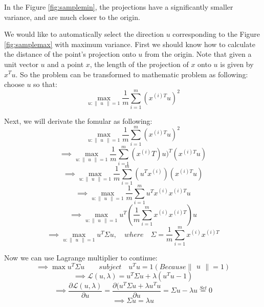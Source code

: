 \documentclass[a4paper]{article}
\begin{document}
In the Figure \ref{fig:samplemin}, the projections have a significantly smaller variance, and are much closer to the origin.

We would like to automatically select the direction $u$ corresponding to the Figure \ref{fig:samplemax} with maximum variance.  First we should know how to calculate the distance of the point's projection onto $u$ from the origin. Note that given a unit vector $u$ and a point $x$, the length of the projection of $x$ onto $u$ is given by $x^{T}u$. So the problem can be transformed to mathematic problem as following: choose $u$ so that:
$$
	\max_{u:\begin{Vmatrix}u\end{Vmatrix}=1} \frac{1}{m} \sum_{i=1}^{m}(x^{(i)T}u)^{2}
$$

Next, we will derivate the fomular as following:
$$
	\max_{u:\begin{Vmatrix}u\end{Vmatrix}=1} \frac{1}{m} \sum_{i=1}^{m}(x^{(i)T}u)^{2}
$$
$$
	\implies \max_{u:\begin{Vmatrix}u\end{Vmatrix}=1} \frac{1}{m} \sum_{i=1}^{m}(x^(i)T)u)^{T}(x^{(i)T}u)
$$
$$
	\implies \max_{u:\begin{Vmatrix}u\end{Vmatrix}=1} \frac{1}{m} \sum_{i=1}^{m}(u^Tx^{(i)})(x^{(i)T}u)
$$
$$
	\implies \max_{u:\begin{Vmatrix}u\end{Vmatrix}=1} \frac{1}{m} \sum_{i=1}^{m}u^Tx^{(i)}x^{(i)T}u
$$
$$
	\implies \max_{u:\begin{Vmatrix}u\end{Vmatrix}=1} u^T (\frac{1}{m}\sum_{i=1}^{m}x^{(i)}x^{(i)T})u
$$
$$
	\implies \max_{u:\begin{Vmatrix}u\end{Vmatrix}=1} u^T \Sigma u, \quad where \quad \Sigma=\frac{1}{m}\sum_{i=1}^{m}x^{(i)}x^{(i)T}
$$

Now we can use Lagrange multiplier to continue: 
$$
	\implies \max u^T \Sigma u
   	\quad \quad subject\quad u^Tu = 1(Because \begin{Vmatrix}u\end{Vmatrix}=1)
$$
$$
	\implies \mathcal{L}(u,\lambda) = u^T \Sigma u + \lambda (u^Tu - 1)
$$
$$
	\implies \frac{\partial \mathcal{L}(u,\lambda)}{\partial u} = \frac{\partial(u^T\Sigma u+\lambda u^Tu}{\partial u}
    = \Sigma u - \lambda u \overset{Set}{=} 0
$$
$$
	\implies \Sigma u = \lambda u
$$
\end{document}
